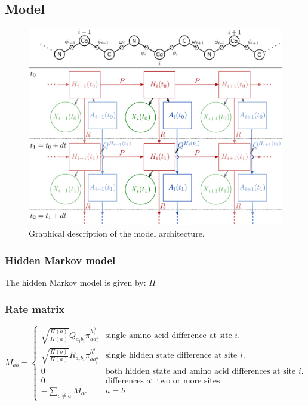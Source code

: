 \documentclass[nogrid]{MBE}%
\begin{document}
\subsection{Model}

\begin{figure}
	\centering
	\includegraphics[width=2.0\columnwidth]{figures/model-structure-final.pdf}
	\caption{Graphical description of the model architecture.}%
	\label{fig:model-structure}%
\end{figure}

\subsubsection{Hidden Markov model}
The hidden Markov model is given by: $\Pi$

\subsubsection{Rate matrix}
\begin{equation}
M_{ab}=\begin{cases}
\sqrt{\frac{\Pi(b)}{\Pi(a)}}Q_{a_{i}b_{i}}\pi^{h^{b}_{i}}_{aa^{b}_{i}} & \text{single amino acid difference at site $i$.}\\
\sqrt{\frac{\Pi(b)}{\Pi(a)}}R_{a_{i}b_{i}}\pi^{h^{b}_{i}}_{aa^{b}_{i}} & \text{single hidden state difference at site $i$.}\\
0 & \text{both hidden state and amino acid differences at site $i$.}\\
0 & \text{differences at two or more sites.}\\
-\underset{c\neq a}{\sum}M_{ac} & a=b
\end{cases}
\end{equation}
\end{document}
